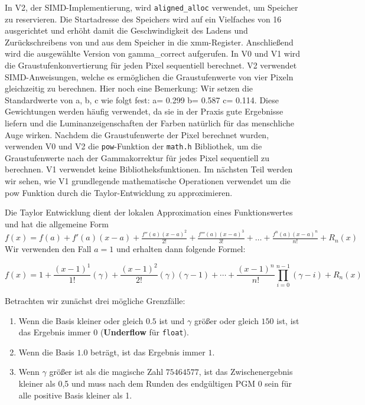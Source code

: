 \documentclass[course=erap]{aspdoc}
\begin{document}
\par
In V2, der SIMD-Implementierung, wird \texttt{aligned\_alloc}\cite{man2022aligned_alloc} verwendet, um Speicher zu reservieren. Die Startadresse des Speichers wird auf ein Vielfaches von 16 ausgerichtet und erhöht damit die Geschwindigkeit des Ladens und Zurückschreibens von und aus dem Speicher in die xmm-Register. Anschließend wird die ausgewählte Version von gamma\_correct aufgerufen. In V0 und V1 wird die Graustufenkonvertierung für jeden Pixel sequentiell berechnet. V2 verwendet SIMD-Anweisungen, welche es ermöglichen die Graustufenwerte von vier Pixeln gleichzeitig zu berechnen. Hier noch eine Bemerkung: Wir setzen die Standardwerte von a, b, c wie folgt fest: a= 0.299 b= 0.587 c= 0.114. Diese Gewichtungen werden häufig verwendet\cite{w3c1996sRGB}, da sie in der Praxis gute Ergebnisse liefern und die Luminanzeigenschaften der Farben natürlich für das menschliche Auge wirken. Nachdem die Graustufenwerte der Pixel berechnet wurden, verwenden V0 und V2 die \texttt{pow}-Funktion der \texttt{math.h} Bibliothek, um die Graustufenwerte nach der Gammakorrektur für jedes Pixel sequentiell zu berechnen. V1 verwendet keine Bibliotheksfunktionen. Im nächsten Teil werden wir sehen, wie V1 grundlegende mathematische Operationen verwendet um die pow Funktion durch die Taylor-Entwicklung zu approximieren.

\par
Die Taylor Entwicklung \cite{mathworld2024taylorseries} dient der lokalen Approximation eines Funktionswertes und hat die allgemeine Form $f(x) = f(a) + f'(a)(x-a) + \frac{{f''(a)(x-a)^2}}{2!} + \frac{{f'''(a)(x-a)^3}}{3!} + \ldots + \frac{{f^n(a)(x-a)^n}}{n!} + R_n(x) $ Wir verwenden den Fall $a=1$ und erhalten dann folgende Formel:

\begin{equation}
f(x) = 1 + \frac{(x-1)^1}{1!} (\gamma) + \frac{(x-1)^2}{2!} (\gamma)(\gamma-1)  + \cdots + \frac{(x-1)^n}{n!} \prod_{i=0}^{n-1} (\gamma-i) + R_n(x)
\end{equation}

\par
Betrachten wir zunächst drei mögliche Grenzfälle:
\begin{enumerate}
\item Wenn die Basis kleiner oder gleich \(0.5\) ist und $\gamma$ größer oder gleich \(150\) ist, ist das Ergebnis immer \(0\) (\textbf{Underflow} für \texttt{float}).
\item Wenn die Basis \(1.0\) beträgt, ist das Ergebnis immer \(1\).
\item Wenn $\gamma$ größer ist als die magische Zahl \(75464577\),  ist das Zwischenergebnis kleiner als 0,5 und muss nach dem Runden des endgültigen PGM 0 sein für alle positive Basis kleiner als 1.
\end{enumerate}
\end{document}
